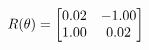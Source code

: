 \documentclass[preview]{standalone}
\begin{document}
\begin{align*}
\special{dvisvgm:raw <g id='unique000'>}R(\theta) = \begin{bmatrix}0.02 & -1.00\\1.00 & 0.02\end{bmatrix}\special{dvisvgm:raw </g>}
\end{align*}
\end{document}
